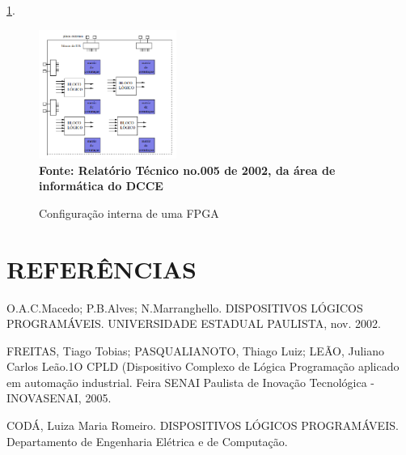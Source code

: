 \ref{fig:figura1}. 
\begin{figure}[ht]
	\centering	
	\caption[\hspace{0.1cm}]{Configuração interna de uma FPGA}
\includegraphics[width=0.4\textwidth]{figuras/FPGA.png}
	 \vspace{-0.2cm}
	\\\textbf{\footnotesize Fonte: Relatório Técnico no.005 de 2002, da área de informática do DCCE}
	\label{fig:figura1}
\end{figure}
\vspace{-0.5cm}

\newpage
\section{REFERÊNCIAS}
O.A.C.Macedo; P.B.Alves;  N.Marranghello. DISPOSITIVOS LÓGICOS PROGRAMÁVEIS. UNIVERSIDADE ESTADUAL PAULISTA, nov. 2002.

FREITAS, Tiago Tobias; PASQUALIANOTO, Thiago Luiz; LEÃO, Juliano Carlos Leão.1O CPLD (Dispositivo Complexo de Lógica Programação aplicado em automação industrial. Feira SENAI Paulista de Inovação Tecnológica  -  INOVASENAI, 2005.

 CODÁ, Luiza Maria Romeiro. DISPOSITIVOS LÓGICOS PROGRAMÁVEIS. Departamento de Engenharia Elétrica e de Computação.
 

 
